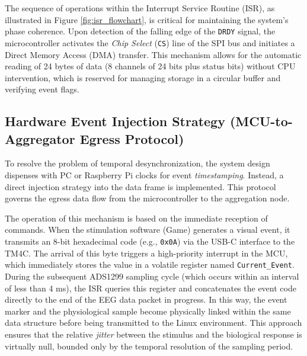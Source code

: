 The sequence of operations within the Interrupt Service Routine (ISR), as illustrated in Figure \ref{fig:isr_flowchart}, is critical for maintaining the system's phase coherence. Upon detection of the falling edge of the \texttt{DRDY} signal, the microcontroller activates the \textit{Chip Select} (\texttt{CS}) line of the SPI bus and initiates a Direct Memory Access (DMA) transfer. This mechanism allows for the automatic reading of 24 bytes of data (8 channels of 24 bits plus status bits) without CPU intervention, which is reserved for managing storage in a circular buffer and verifying event flags.

\subsection{Hardware Event Injection Strategy (MCU-to-Aggregator Egress Protocol)}
To resolve the problem of temporal desynchronization, the system design dispenses with PC or Raspberry Pi clocks for event \textit{timestamping}. Instead, a direct injection strategy into the data frame is implemented. This protocol governs the egress data flow from the microcontroller to the aggregation node.

The operation of this mechanism is based on the immediate reception of commands. When the stimulation software (Game) generates a visual event, it transmits an 8-bit hexadecimal code (e.g., \texttt{0x0A}) via the USB-C interface to the TM4C. The arrival of this byte triggers a high-priority interrupt in the MCU, which immediately stores the value in a volatile register named \texttt{Current\_Event}. During the subsequent ADS1299 sampling cycle (which occurs within an interval of less than 4 ms), the ISR queries this register and concatenates the event code directly to the end of the EEG data packet in progress. In this way, the event marker and the physiological sample become physically linked within the same data structure before being transmitted to the Linux environment. This approach ensures that the relative \textit{jitter} between the stimulus and the biological response is virtually null, bounded only by the temporal resolution of the sampling period.

